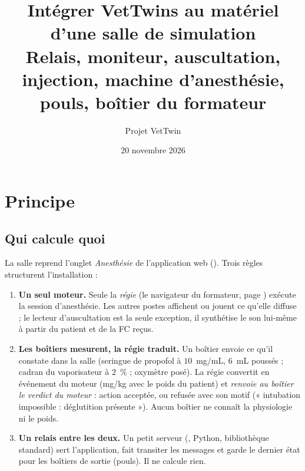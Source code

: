 \documentclass[11pt,a4paper]{article}
\title{Intégrer VetTwins au matériel d'une salle de simulation\\[0.3em]
\large Relais, moniteur, auscultation, injection, machine d'anesthésie, pouls, boîtier du formateur}
\author{Projet VetTwin}
\date{20 novembre 2026}
\begin{document}
\sloppy
\maketitle

\begin{center}
\end{center}

\tableofcontents

\section{Principe}
\subsection{Qui calcule quoi}
La salle reprend l'onglet \emph{Anesthésie} de l'application web (). Trois règles
structurent l'installation :
\begin{enumerate}
  \item \textbf{Un seul moteur.} Seule la \emph{régie} (le navigateur du formateur, page )
  exécute la session d'anesthésie. Les autres postes affichent ou jouent ce qu'elle diffuse ; le lecteur
  d'auscultation est la seule exception, il synthétise le son lui-même à partir du patient et de la FC reçus.
  \item \textbf{Les boîtiers mesurent, la régie traduit.} Un boîtier envoie ce qu'il constate dans la salle (seringue
  de propofol à \(10\)~mg/mL, \(6\)~mL poussés ; cadran du vaporisateur à \(2\)~\% ; oxymètre posé). La régie convertit
  en événement du moteur (mg/kg avec le poids du patient) et \emph{renvoie au boîtier le verdict du moteur} : action
  acceptée, ou refusée avec son motif (« intubation impossible : déglutition présente »). Aucun boîtier ne connaît
  la physiologie ni le poids.
  \item \textbf{Un relais entre les deux.} Un petit serveur (, Python, bibliothèque standard)
  sert l'application, fait transiter les messages et garde le dernier état pour les boîtiers de sortie (pouls).
  Il ne calcule rien.
\end{enumerate}
\end{document}
